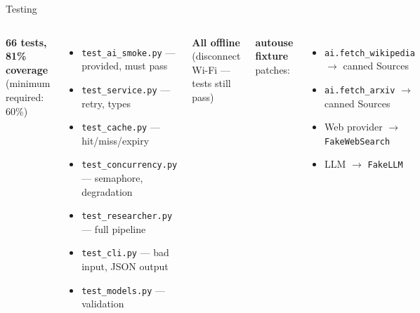 \documentclass[aspectratio=169]{beamer}
\begin{document}
\begin{frame}{Testing}
\begin{columns}
  \textbf{66 tests, 81\% coverage}\\(minimum required: 60\%)

  \vspace{0.7em}
  \begin{itemize}
    \item \texttt{test\_ai\_smoke.py} — provided, must pass
    \item \texttt{test\_service.py} — retry, types
    \item \texttt{test\_cache.py} — hit/miss/expiry
    \item \texttt{test\_concurrency.py} — semaphore, degradation
    \item \texttt{test\_researcher.py} — full pipeline
    \item \texttt{test\_cli.py} — bad input, JSON output
    \item \texttt{test\_models.py} — validation
  \end{itemize}

  \textbf{All offline}\\(disconnect Wi-Fi — tests still pass)

  \vspace{0.7em}
  \textbf{autouse fixture} patches:\\
  \begin{itemize}
    \item \texttt{ai.fetch\_wikipedia} $\to$ canned Sources
    \item \texttt{ai.fetch\_arxiv} $\to$ canned Sources
    \item Web provider $\to$ \texttt{FakeWebSearch}
    \item LLM $\to$ \texttt{FakeLLM}
  \end{itemize}
\end{columns}
\end{frame}
\end{document}
